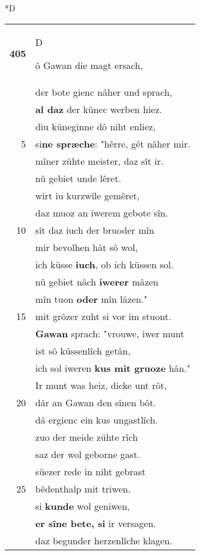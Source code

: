\documentclass[8pt,a4paper,notitlepage]{article}
\begin{document}
\begin{table}[ht]
\begin{minipage}[t]{0.5\linewidth}
\small
\begin{center}*D
\end{center}
\begin{tabular}{rl}
\textbf{405} & \begin{large}D\end{large}ô Gawan die magt ersach,\\ 
 & der bote gienc nâher und sprach,\\ 
 & \textbf{al daz} der künec werben hiez.\\ 
 & diu küneginne dô niht enliez,\\ 
5 & si\textbf{ne spræche}: "hêrre, gêt nâher mir.\\ 
 & mîner zühte meister, daz sît ir.\\ 
 & nû gebiet unde lêret.\\ 
 & wirt iu kurzwîle gemêret,\\ 
 & daz muoz an iwerem gebote sîn.\\ 
10 & sît daz iuch der bruoder mîn\\ 
 & mir bevolhen hât sô wol,\\ 
 & ich küsse \textbf{iuch}, ob ich küssen sol.\\ 
 & nû gebiet nâch \textbf{iwerer} mâzen\\ 
 & mîn tuon \textbf{oder} mîn lâzen."\\ 
15 & mit grôzer zuht si vor im stuont.\\ 
 & \textbf{Gawan} sprach: "vrouwe, iwer munt\\ 
 & ist sô küssenlîch getân,\\ 
 & ich sol iweren \textbf{kus mit gruoze} hân."\\ 
 & Ir munt was heiz, dicke unt rôt,\\ 
20 & dâr an Gawan den sînen bôt.\\ 
 & dâ ergienc ein kus ungastlîch.\\ 
 & zuo der meide zühte rîch\\ 
 & saz der wol geborne gast.\\ 
 & süezer rede in niht gebrast\\ 
25 & bêdenthalp mit triwen.\\ 
 & si \textbf{kunde} wol geniwen,\\ 
 & \textbf{er sîne bete, si} ir versagen.\\ 
 & daz begunder herzenlîche klagen.\\ 

\end{tabular}
\end{minipage}
\end{table}
\end{document}
